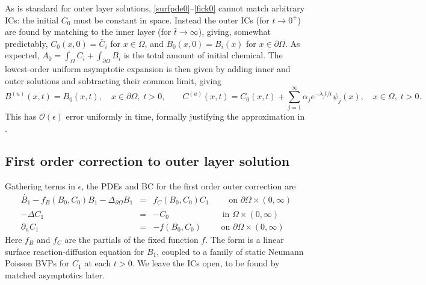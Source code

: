 \documentclass[10pt]{article}
\newcommand{\be}{\begin{equation}}
\newcommand{\ee}{\end{equation}}
\newcommand{\bea}{\begin{eqnarray}}
\newcommand{\eea}{\end{eqnarray}}
\newcommand{\bigO}{{\mathcal O}}
\newcommand{\qqquad}{\qquad\qquad}
\newcommand{\pO}{{\partial\Omega}}
\newcommand{\LpO}{\Delta_\pO}
\newcommand{\eps}{\epsilon}
\newcommand{\dn}{\partial_n}
\begin{document}
As is standard for outer layer solutions,
\eqref{surfpde0}--\eqref{fick0} cannot match arbitrary ICs:
the initial $C_0$ must be constant in space.
Instead the outer ICs (for $t\to 0^+$) are found by matching
to the inner layer (for $\bar{t}\to\infty$),
giving,
somewhat predictably,
$C_0(x,0)=\bar{C}_i$ for $x\in\Omega$, and
$B_0(x,0)=B_i(x)$ for $x\in\pO$.
As expected, $A_0 = \int_\Omega C_i + \int_\pO B_i$ is the total amount
of initial chemical.
The lowest-order uniform asymptotic expansion is then given by adding
inner and outer solutions and subtracting their common limit,
giving
\be
B^{(u)}(x,t) = B_0(x,t), \quad x\in\pO,\;t>0,
\qquad
C^{(u)}(x,t) = C_0(x,t) + \sum_{j=1}^\infty \alpha_j e^{-\lambda_j t/\eps} \psi_j(x),
\quad x\in\Omega, \; t>0.
\label{unif0}
\ee
This has $\bigO(\eps)$ error uniformly in time, formally justifying
the approximation in \cite{diegmiller18}.



\subsection{First order correction to outer layer solution}

Gathering terms in $\eps$, the PDEs and BC for the first order outer correction are
\bea
\dot{B_1} - f_B(B_0,C_0) B_1 - \LpO B_1
&=&  f_C(B_0,C_0) C_1  \qquad \mbox{ on } \pO \times (0,\infty)
\label{surfpde1}
\\
- \Delta C_1   &=& -\dot{C_0}   \qquad\qqquad \mbox{ in } \Omega \times (0,\infty)
\label{pde1}
\\
\dn C_1  &=& -f(B_0,C_0) \qquad \mbox{ on } \pO \times (0,\infty)
\label{fick1}
\eea
Here $f_B$ and $f_C$ are the partials of the fixed function $f$.
The form is a linear surface reaction-diffusion equation for $B_1$,
coupled to a family of static Neumann Poisson BVPs for $C_1$ at each $t>0$.
We leave the ICs open, to be found by matched asymptotics later.
\end{document}
